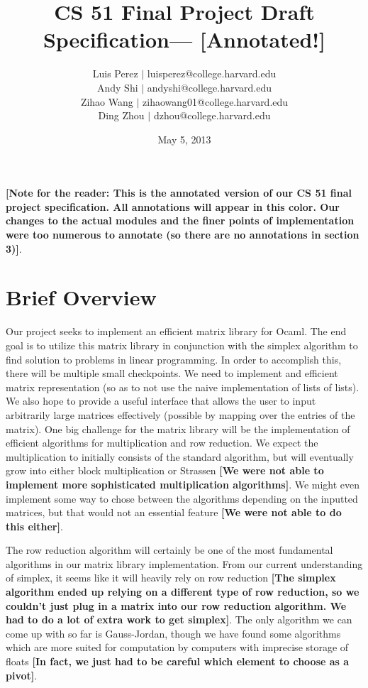 \documentclass[letterpaper,11pt]{article}
\newcommand{\annot}[1]{\textbf{\color{BrickRed} [#1]}}
\begin{document}
\title{CS 51 Final Project Draft Specification---\annot{Annotated!}}
\author{
Luis Perez $|$ luisperez@college.harvard.edu \\ 
Andy Shi $|$ andyshi@college.harvard.edu \\ 
Zihao Wang $|$ zihaowang01@college.harvard.edu \\ 
Ding Zhou $|$ dzhou@college.harvard.edu
}
\date{May 5, 2013}
\maketitle

{\annot{Note for the reader: This is the annotated version of our CS 51 final
project specification. All annotations will appear in this color. Our changes to
the actual modules and the finer points of implementation were too numerous to
annotate (so there are no annotations in section 3)}}.

\section{Brief Overview}

Our project seeks to implement an efficient matrix library for Ocaml. The end
goal is to utilize this matrix library in conjunction with the simplex algorithm
to find solution to problems in linear programming. In order to accomplish this,
there will be multiple small checkpoints. We need to implement and efficient
matrix representation (so as to not use the naive implementation of lists of
lists). We also hope to provide a useful interface that allows the user to input
arbitrarily large matrices effectively (possible by mapping over the entries of
the matrix). One big challenge for the matrix library will be the implementation
of efficient algorithms for multiplication and row reduction. We expect the
multiplication to initially consists of the standard algorithm, but will
eventually grow into either block multiplication or Strassen {\annot{We were not
able to implement more sophisticated multiplication algorithms}}. We might even
implement some way to chose between the algorithms depending on the inputted
matrices, but that would not an essential feature {\annot{We were not able to do
this either}}.

The row reduction algorithm will certainly be one of the most fundamental
algorithms in our matrix library implementation. From our current understanding
of simplex, it seems like it will heavily rely on row reduction {\annot{The
simplex algorithm ended up relying on a different type of row reduction, so we
couldn't just plug in a matrix into our row reduction algorithm. We had to do a
lot of extra work to get simplex}}. The only algorithm we can come up with so
far is Gauss-Jordan, though we have found some algorithms which are more suited
for computation by computers with imprecise storage of floats {\annot{In fact,
we just had to be careful which element to choose as a pivot}}.
\end{document}
